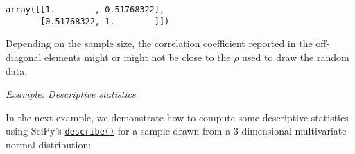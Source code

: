 \documentclass{scrartcl}
\makeatletter
\newcommand{\boxspacing}{\kern\kvtcb@left@rule\kern\kvtcb@boxsep}
\newcommand{\prompt}[4]{
        {\ttfamily\llap{{\color{#2}[#3]:\hspace{3pt}#4}}\vspace{-\baselineskip}}
    }
\makeatother
\begin{document}
            \begin{tcolorbox}[breakable, size=fbox, boxrule=.5pt, pad at break*=1mm, opacityfill=0]
\prompt{Out}{outcolor}{17}{\boxspacing}
\begin{Verbatim}[commandchars=\\\{\}]
array([[1.        , 0.51768322],
       [0.51768322, 1.        ]])
\end{Verbatim}
\end{tcolorbox}
        
    Depending on the sample size, the correlation coefficient reported in
the off-diagonal elements might or might not be close to the \(\rho\)
used to draw the random data.

\vspace{1em}\emph{Example: Descriptive statistics}

In the next example, we demonstrate how to compute some descriptive
statistics using SciPy's
\href{https://docs.scipy.org/doc/scipy/reference/generated/scipy.stats.describe.html}{\texttt{describe()}}
for a sample drawn from a 3-dimensional multivariate normal
distribution:
\end{document}
